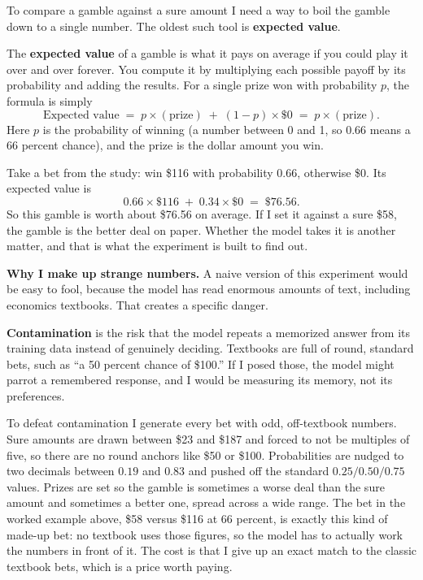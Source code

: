 \documentclass[11pt]{article}
\newcommand{\term}[1]{\textbf{\color{mossdk}#1}}
\begin{document}
To compare a gamble against a sure amount I need a way to boil the gamble down to a single number. The
oldest such tool is \term{expected value}.

\begin{defbox}
The \term{expected value} of a gamble is what it pays on average if you could play it over and over
forever. You compute it by multiplying each possible payoff by its probability and adding the results.
For a single prize won with probability $p$, the formula is simply
\[
\text{Expected value} \;=\; p \times (\text{prize}) \;+\; (1-p) \times \$0 \;=\; p \times (\text{prize}).
\]
Here $p$ is the probability of winning (a number between 0 and 1, so $0.66$ means a 66 percent chance),
and the prize is the dollar amount you win.
\end{defbox}

\begin{workbox}
Take a bet from the study: win \$116 with probability $0.66$, otherwise \$0. Its expected value is
\[
0.66 \times \$116 \;+\; 0.34 \times \$0 \;=\; \$76.56.
\]
So this gamble is worth about \$76.56 on average. If I set it against a sure \$58, the gamble is the
better deal on paper. Whether the model takes it is another matter, and that is what the experiment is
built to find out.
\end{workbox}

\textbf{Why I make up strange numbers.} A naive version of this experiment would be easy to fool,
because the model has read enormous amounts of text, including economics textbooks. That creates a
specific danger.

\begin{defbox}[Contamination]
\term{Contamination} is the risk that the model repeats a memorized answer from its training data
instead of genuinely deciding. Textbooks are full of round, standard bets, such as ``a 50 percent
chance of \$100.'' If I posed those, the model might parrot a remembered response, and I would be
measuring its memory, not its preferences.
\end{defbox}

To defeat contamination I generate every bet with odd, off-textbook numbers. Sure amounts are drawn
between \$23 and \$187 and forced to not be multiples of five, so there are no round anchors like \$50 or
\$100. Probabilities are nudged to two decimals between $0.19$ and $0.83$ and pushed off the standard
$0.25 / 0.50 / 0.75$ values. Prizes are set so the gamble is sometimes a worse deal than the sure amount
and sometimes a better one, spread across a wide range. The bet in the worked example above, \$58 versus
\$116 at 66 percent, is exactly this kind of made-up bet: no textbook uses those figures, so the model
has to actually work the numbers in front of it. The cost is that I give up an exact match to the
classic textbook bets, which is a price worth paying.
\end{document}
